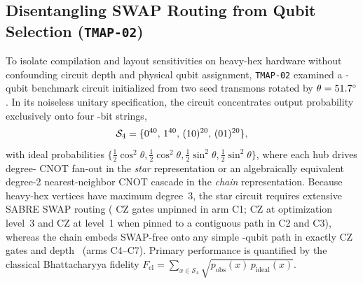 \documentclass[twocolumn,aps,prapplied,superscriptaddress,floatfix]{revtex4-2}
\begin{document}
\subsection{Disentangling SWAP Routing from Qubit Selection (\texttt{TMAP-02})}

To isolate compilation and layout sensitivities on heavy-hex hardware without confounding circuit depth and physical qubit assignment, \texttt{TMAP-02} examined a \TmapCircuitQubits{}-qubit benchmark circuit initialized from two seed transmons rotated by $\theta=51.7^\circ$. In its noiseless unitary specification, the circuit concentrates output probability exclusively onto four \TmapCircuitQubits{}-bit strings,
\begin{equation}
\mathcal{S}_4 = \{0^{40},\, 1^{40},\, (10)^{20},\, (01)^{20}\},
\end{equation}
with ideal probabilities $\{\frac{1}{2}\cos^2\theta, \frac{1}{2}\cos^2\theta, \frac{1}{2}\sin^2\theta, \frac{1}{2}\sin^2\theta\}$, where each hub drives degree-\TmapStarHubDeg{} CNOT fan-out in the \emph{star} representation or an algebraically equivalent degree-2 nearest-neighbor CNOT cascade in the \emph{chain} representation. Because heavy-hex vertices have maximum degree~3, the star circuit requires extensive SABRE SWAP routing (\TmapStarFreeCz{} CZ gates unpinned in arm C1; \TmapStarOptThreeCz{} CZ at optimization level~3 and \TmapStarOptOneCz{} CZ at level~1 when pinned to a contiguous path in C2 and C3), whereas the chain embeds SWAP-free onto any simple \TmapCircuitQubits{}-qubit path in exactly \TmapChainCz{} CZ gates and depth~\TmapChainDepth{} (arms C4--C7). Primary performance is quantified by the classical Bhattacharyya fidelity $F_{\mathrm{cl}} = \sum_{x \in \mathcal{S}_4} \sqrt{p_{\mathrm{obs}}(x)\, p_{\mathrm{ideal}}(x)}$.
\end{document}

